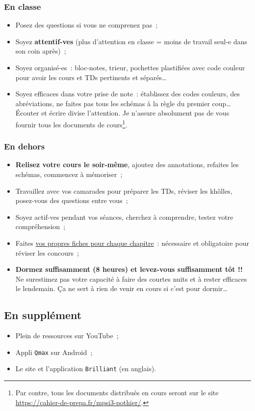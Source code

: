 \subsubsection{En classe}
\begin{itemize}
	\item Posez des questions si vous ne comprenez pas~;
	\item Soyez \textbf{attentif-ves} (plus d'attention en classe = moins de
	      travail seul-e dans son coin après)~;
	\item Soyez organisé-es~: bloc-notes, trieur, pochettes plastifiées avec
	      code couleur pour avoir les cours et TDs pertinents et séparés…
	\item Soyez efficaces dans votre prise de note~: établissez des codes
	      couleurs, des abréviations, ne faites pas tous les schémas à la règle du
	      premier coup… Écouter et écrire divise l'attention. Je n'assure
	      absolument pas de vous fournir tous les documents de cours\footnote{Par
		      contre, tous les documents distribués en cours seront sur le site
		      \href{https://cahier-de-prepa.fr/mpsi3-pothier/}
		      {https://cahier-de-prepa.fr/mpsi3-pothier/}.}.
\end{itemize}

\subsubsection{En dehors}
\begin{itemize}
	\item \textbf{Relisez votre cours le soir-même}, ajoutez des annotations,
	      refaites les schémas, commencez à mémoriser~;
	\item Travaillez avec vos camarades pour préparer les TDs, réviser les
	      khôlles, posez-vous des questions entre vous~;
	\item Soyez actif-ves pendant vos séances, cherchez à comprendre, testez
	      votre compréhension~;
	\item Faites \underline{vos propres fiches pour chaque chapitre}~:
	      nécessaire et obligatoire pour réviser les concours~;
	\item \textbf{Dormez suffisamment (8 heures) et levez-vous suffisamment tôt
		      !!} Ne surestimez pas votre capacité à faire des courtes nuits et à
	      rester efficaces le lendemain. Ça ne sert à rien de venir en cours si
	      c'est pour dormir…
\end{itemize}

\subsection{En supplément}

\begin{itemize}
	\item Plein de ressources sur YouTube~;
	\item Appli \texttt{Qmax} sur Android~;
	\item Le site et l'application \texttt{Brilliant} (en anglais).
\end{itemize}

